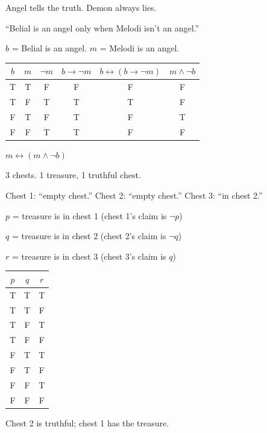 \documentclass{article}
\begin{document}
Angel tells the truth. Demon always lies.

\medskip

``Belial is an angel only when Melodi isn't an angel.''

\medskip

$b$ = Belial is an angel. $m$ = Melodi is an angel.

\medskip

\begin{tabular}{cc|c|c|c|c}
$b$ & $m$ & $\lnot m$ & $b \to \lnot m$ & $b \leftrightarrow (b \to \lnot m)$ & $m \land \lnot b$ \\
\hline
T & T & F & F & F & F \\
T & F & T & T & T & F \\
F & T & F & T & F & T \\
F & F & T & T & F & F
\end{tabular}

\medskip

$m \leftrightarrow (m \land \lnot b)$

\bigskip

3 chests. 1 treasure, 1 truthful chest.

\medskip

Chest 1: ``empty chest.'' \quad Chest 2: ``empty chest.'' \quad Chest 3: ``in chest 2.''

\medskip

$p$ = treasure is in chest 1 (chest 1's claim is $\lnot p$)

$q$ = treasure is in chest 2 (chest 2's claim is $\lnot q$)

$r$ = treasure is in chest 3 (chest 3's claim is $q$)

\medskip

\begin{tabular}{ccc}
$p$ & $q$ & $r$ \\
\hline
T & T & T \\
T & T & F \\
T & F & T \\
T & F & F \\
F & T & T \\
F & T & F \\
F & F & T \\
F & F & F
\end{tabular}

\medskip

Chest 2 is truthful; chest 1 has the treasure.
\end{document}
